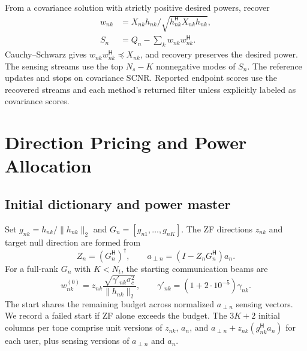 \documentclass[journal]{IEEEtran}
\newcommand{\HH}{^{\mathsf H}}
\newcommand{\norm}[1]{\lVert #1\rVert}
\begin{document}
From a covariance solution with strictly positive desired powers, recover
\begin{equation}
 \begin{aligned}
 w_{nk}&=X_{nk}h_{nk}/\sqrt{h_{nk}\HH X_{nk}h_{nk}},\\
 S_n&=Q_n-\sum_k w_{nk}w_{nk}\HH .
 \end{aligned}
 \label{eq:recover}
\end{equation}
Cauchy--Schwarz gives \(w_{nk}w_{nk}\HH\preceq X_{nk}\), and recovery preserves the desired power. The sensing streams use the top \(N_s-K\) nonnegative modes of \(S_n\). The reference updates and stops on covariance SCNR. Reported endpoint scores use the recovered streams and each method's returned filter unless explicitly labeled as covariance scores.

\section{Direction Pricing and Power Allocation}
\subsection{Initial dictionary and power master}
Set \(g_{nk}=h_{nk}/\norm{h_{nk}}_2\) and \(G_n=[g_{n1},\ldots,g_{nK}]\). The ZF directions \(z_{nk}\) and target null direction are formed from
\begin{equation}
 Z_n=(G_n\HH)^\dagger,\qquad a_{\perp n}=(I-Z_nG_n\HH)a_n .
 \label{eq:zf}
\end{equation}
For a full-rank \(G_n\) with \(K<N_t\), the starting communication beams are
\begin{equation}
 w_{nk}^{(0)}=z_{nk}\frac{\sqrt{\gamma'_{nk}\sigma_c^2}}{\norm{h_{nk}}_2},
 \qquad \gamma'_{nk}=(1+2\cdot10^{-5})\gamma_{nk}.
\end{equation}
The start shares the remaining budget across normalized \(a_{\perp n}\) sensing vectors. We record a failed start if ZF alone exceeds the budget. The \(3K+2\) initial columns per tone comprise unit versions of \(z_{nk}\), \(a_n\), and \(a_{\perp n}+z_{nk}(g_{nk}\HH a_n)\) for each user, plus sensing versions of \(a_{\perp n}\) and \(a_n\).
\end{document}
